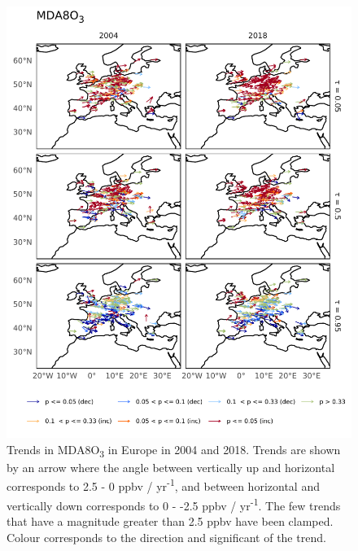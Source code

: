 \documentclass{article}
\begin{document}
\begin{figure}[p]
\centering
\includegraphics[height=0.9\textheight]{figures/si_figures/fS06_o3_map_mda8_all_eu_o3.pdf}
\caption{Trends in MDA8O\textsubscript{3} in Europe in 2004 and 2018. Trends are shown by an arrow where the angle between vertically up and horizontal corresponds to 2.5 - 0 ppbv / yr\textsuperscript{-1}, and between horizontal and vertically down corresponds to 0 - -2.5 ppbv / yr\textsuperscript{-1}. The few trends that have a magnitude greater than 2.5 ppbv have been clamped. Colour corresponds to the direction and significant of the trend.}
\label{si_fig:o3_map_eu_mda8}
\end{figure}
\clearpage
\end{document}
